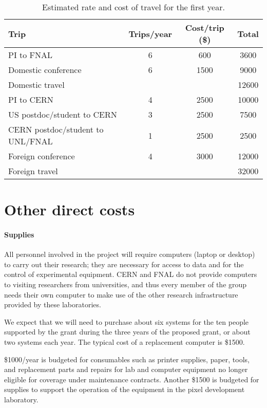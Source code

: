 \documentclass[11pt]{article}
\begin{document}
\begin{table}[h]
\centering
\begin{tabular}{|l|cc|c|}\hline
Trip &  Trips/year & Cost/trip (\$) & Total\\\hline
PI to FNAL & 6 & 600 & 3600\\ 
Domestic conference & 6 & 1500 & 9000\\\hline
Domestic travel & & & 12600\\\hline
PI to CERN & 4 & 2500 & 10000\\
US postdoc/student to CERN & 3 & 2500 &7500\\
CERN postdoc/student to UNL/FNAL & 1 & 2500 & 2500\\
Foreign conference & 4 & 3000 & 12000\\\hline 
Foreign travel & & & 32000\\\hline
\end{tabular}
\caption{Estimated rate and cost of travel for the first year.} 
\label{tab:trips}
\end{table}



\section{Other direct costs}

\paragraph{Supplies} All personnel involved in the project will
require computers (laptop or desktop) to carry out their research; they are
necessary for access to data and for the control of experimental equipment.
CERN and FNAL do not provide computers to visiting researchers from
universities, and thus every member of the group needs their own computer
to make use of the other research infrastructure provided by these
laboratories.  

We expect that we will need to purchase about six systems for the ten
people supported by the grant during the three years of the proposed grant,
or about two systems each year.  The typical cost of a replacement
computer is \$1500.

\$1000/year is budgeted for consumables such as printer supplies, paper,
tools, and replacement parts and repairs for lab and computer equipment no
longer eligible for coverage under maintenance contracts.  Another \$1500
is budgeted for supplies to support the operation of the equipment in the
pixel development laboratory.
\end{document}
